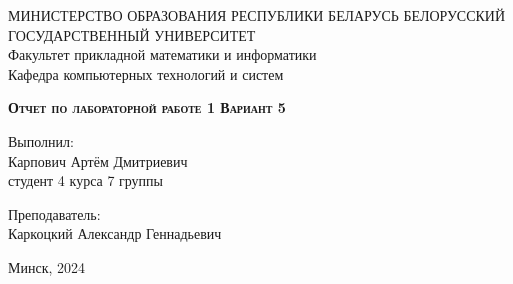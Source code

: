 \documentclass[11pt]{article}
\begin{document}
    \begin{titlepage}
    \newpage
    
    \begin{center}
    МИНИСТЕРСТВО ОБРАЗОВАНИЯ РЕСПУБЛИКИ БЕЛАРУСЬ БЕЛОРУССКИЙ ГОСУДАРСТВЕННЫЙ УНИВЕРСИТЕТ \\
    Факультет прикладной математики и информатики \\ Кафедра компьютерных технологий и систем
    \end{center}
    
    \vspace{8em}
    
    \vspace{2em}
    
    \begin{center}
    \textsc{\textbf{Отчет по лабораторной работе 1
    \linebreak Вариант 5}}
    \end{center}
    
    \vspace{6em}
    
    \begin{flushright}
        Выполнил:\\
        Карпович Артём Дмитриевич\\
        студент 4 курса 7 группы
    \end{flushright}

    \begin{flushright}
        Преподаватель:\\
        Каркоцкий Александр Геннадьевич
    \end{flushright}
    \vspace{\fill}
    
    \begin{center}
    Минск, 2024
    \end{center}
    
    \end{titlepage}
\end{document}
